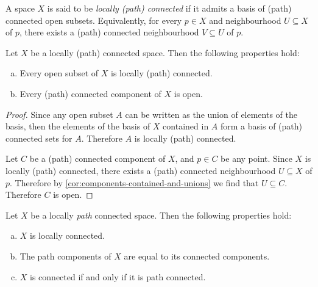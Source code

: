 \begin{definition}
\label{def:local-connected}
A space \(X\) is said to be \emph{locally (path) connected} if it admits a basis
of (path) connected open subsets. Equivalently, for every \(p \in X\) and
neighbourhood \(U \subseteq X\) of \(p\), there exists a (path) connected
neighbourhood \(V \subseteq U\) of \(p\).
\end{definition}

\begin{proposition}
\label{prop:locally-conn-space-properties}
Let \(X\) be a locally (path) connected space. Then the following properties
hold:
\begin{enumerate}[(a)]\setlength\itemsep{0em}
\item Every open subset of \(X\) is locally (path) connected.

\item Every (path) connected component of \(X\) is open.
\end{enumerate}
\end{proposition}

\begin{proof}
Since any open subset \(A\) can be written as the union of elements of the
basis, then the elements of the basis of \(X\) contained in \(A\) form a basis
of (path) connected sets for \(A\). Therefore \(A\) is locally (path) connected.

Let \(C\) be a (path) connected component of \(X\), and \(p \in C\) be any
point. Since \(X\) is locally (path) connected, there exists a (path) connected
neighbourhood \(U \subseteq X\) of \(p\). Therefore by
\cref{cor:components-contained-and-unions} we find that \(U \subseteq
C\). Therefore \(C\) is open.
\end{proof}

\begin{proposition}
\label{prop:locally-conn-space-properties}
Let \(X\) be a locally \emph{path} connected space. Then the following
properties hold:
\begin{enumerate}[(a)]\setlength\itemsep{0em}
\item \(X\) is locally connected.

\item The path components of \(X\) are equal to its connected components.

\item \(X\) is connected if and only if it is path connected.
\end{enumerate}
\end{proposition}

